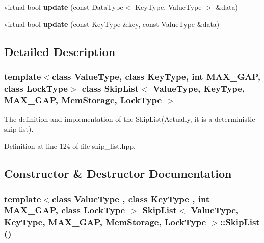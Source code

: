 \begin{CompactItemize}
\item 
\hypertarget{classSkipList_3_01ValueType_00_01KeyType_00_01MAX__GAP_00_01MemStorage_00_01LockType_01_4_cebdb64a34d39bc7391cc7b68674bb43}{
virtual bool \textbf{update} (const DataType$<$ KeyType, ValueType $>$ \&data)}
\label{classSkipList_3_01ValueType_00_01KeyType_00_01MAX__GAP_00_01MemStorage_00_01LockType_01_4_cebdb64a34d39bc7391cc7b68674bb43}

\item 
\hypertarget{classSkipList_3_01ValueType_00_01KeyType_00_01MAX__GAP_00_01MemStorage_00_01LockType_01_4_47126dcf071ccd92ac095d8c2bf4e840}{
virtual bool \textbf{update} (const KeyType \&key, const ValueType \&data)}
\label{classSkipList_3_01ValueType_00_01KeyType_00_01MAX__GAP_00_01MemStorage_00_01LockType_01_4_47126dcf071ccd92ac095d8c2bf4e840}

\end{CompactItemize}


\subsection{Detailed Description}
\subsubsection*{template$<$class ValueType, class KeyType, int MAX\_\-GAP, class LockType$>$ class SkipList$<$ ValueType, KeyType, MAX\_\-GAP, MemStorage, LockType $>$}

The definition and implementation of the SkipList(Actually, it is a deterministic skip list). 

Definition at line 124 of file skip\_\-list.hpp.

\subsection{Constructor \& Destructor Documentation}
\hypertarget{classSkipList_3_01ValueType_00_01KeyType_00_01MAX__GAP_00_01MemStorage_00_01LockType_01_4_625716dcaac1e6d5250135d0ed008f48}{
\subsubsection[{SkipList}]{\setlength{\rightskip}{0pt plus 5cm}template$<$class ValueType , class KeyType , int MAX\_\-GAP, class LockType $>$ SkipList$<$ ValueType, KeyType, MAX\_\-GAP, MemStorage, LockType $>$::SkipList ()}}
\label{classSkipList_3_01ValueType_00_01KeyType_00_01MAX__GAP_00_01MemStorage_00_01LockType_01_4_625716dcaac1e6d5250135d0ed008f48}



